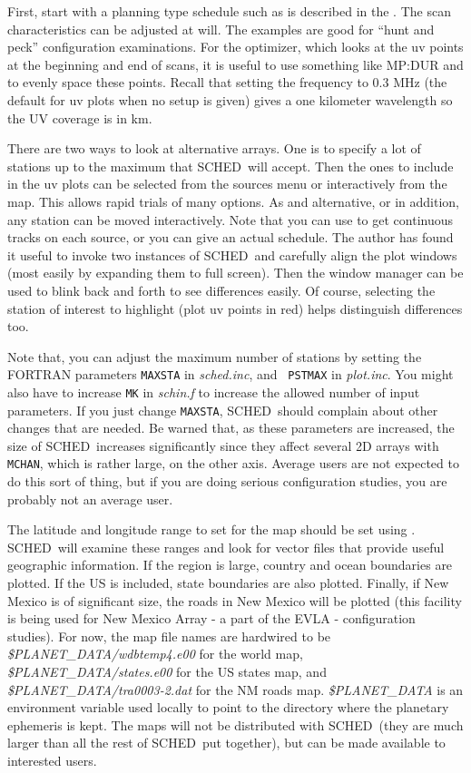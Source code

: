 \documentclass{report}
\newcommand{\schedb}{{\sc SCHED~}}
\begin{document}
First, start with a planning type schedule such as is described in the
.  The scan
characteristics can be adjusted at will.  The examples are good for
``hunt and peck'' configuration examinations.  For the optimizer,
which looks at the uv points at the beginning and end of scans, it is
useful to use something like  {MP:DUR} and
 to evenly space these points.
Recall that setting the frequency to 0.3 MHz (the default for uv plots
when no setup is given) gives a one kilometer wavelength so the UV
coverage is in km.

There are two ways to look at alternative arrays.  One is to specify a
lot of stations up to the maximum that \schedb will accept.  Then the
ones to include in the uv plots can be selected from the sources menu
or interactively from the map.  This allows rapid trials of many
options.  As and alternative, or in addition, any station can be moved
interactively.  Note that you can use  to get continuous tracks on each source, or
you can give an actual schedule.  The author has found it useful to
invoke two instances of \schedb and carefully align the plot windows
(most easily by expanding them to full screen).  Then the window
manager can be used to blink back and forth to see differences easily.
Of course, selecting the station of interest to highlight (plot uv
points in red) helps distinguish differences too.

Note that, you can adjust the maximum number of stations by setting
the FORTRAN parameters {\tt MAXSTA} in {\sl sched.inc}, and {\tt
PSTMAX} in {\sl plot.inc}.  You might also have to increase {\tt MK} in
{\sl schin.f} to increase the allowed number of input parameters.  If
you just change {\tt MAXSTA}, \schedb should complain about other
changes that are needed.  Be warned that, as these parameters are
increased, the size of \schedb increases significantly since they
affect several 2D arrays with {\tt MCHAN}, which is rather large, on
the other axis.  Average users are not expected to do this sort of
thing, but if you are doing serious configuration studies, you are
probably not an average user.

The latitude and longitude range to set for the map should be set
using .  \schedb will examine these
ranges and look for vector files that provide useful geographic
information.  If the region is large, country and ocean boundaries are
plotted.  If the US is included, state boundaries are also plotted.
Finally, if New Mexico is of significant size, the roads in New Mexico
will be plotted (this facility is being used for New Mexico Array - a
part of the EVLA - configuration studies).  For now, the map file
names are hardwired to be {\sl \$PLANET\_DATA/wdbtemp4.e00} for the
world map, {\sl \$PLANET\_DATA/states.e00} for the US states map, and
{\sl \$PLANET\_DATA/tra0003-2.dat} for the NM roads map.  {\sl
\$PLANET\_DATA} is an environment variable used locally to point to the
directory where the planetary ephemeris is kept.  The maps will not
be distributed with \schedb (they are much larger than all the rest
of \schedb put together), but can be made available to interested
users.
\end{document}
